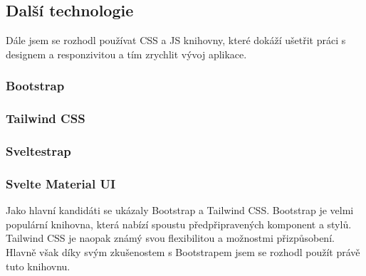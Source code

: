 \subsection{Další technologie}
Dále jsem se rozhodl používat CSS a JS knihovny, které dokáží ušetřit práci s designem a responzivitou a tím zrychlit vývoj aplikace.

\subsubsection*{Bootstrap}
\subsubsection*{Tailwind CSS}
\subsubsection*{Sveltestrap}
\subsubsection*{Svelte Material UI}
Jako hlavní kandidáti se ukázaly Bootstrap a Tailwind CSS. Bootstrap je velmi populární knihovna, která nabízí spoustu předpřipravených komponent a stylů. Tailwind CSS je naopak známý svou flexibilitou a možnostmi přizpůsobení. Hlavně však díky svým zkušenostem s Bootstrapem jsem se rozhodl použít právě tuto knihovnu.